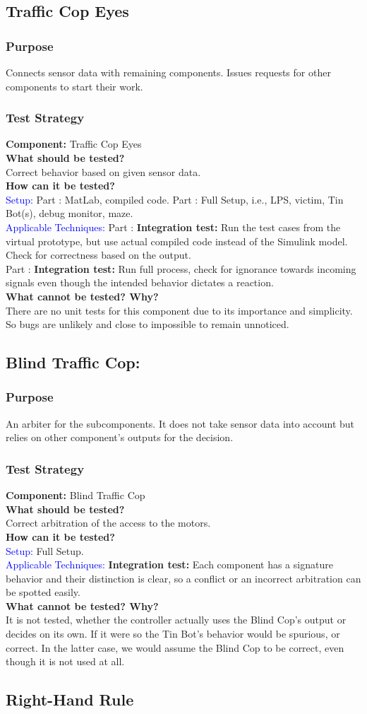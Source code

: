 \documentclass[a4paper,parskip,headheight=38pt]{scrartcl} %
\newcommand*{\rom}[1]{\uppercase\expandafter{\romannumeral #1\relax}}
\newcommand{\teststrat}[5]{
    \subsubsection{Test Strategy}
	\textbf{Component:} #1 \\
	\noindent\textbf{What should be tested?} \\
    \noindent #2 \\
	\noindent\textbf{How can it be tested?} \\
    \noindent\textcolor{blue}{Setup:} #3 \\
    \noindent\textcolor{blue}{Applicable Techniques:} #4 \\
	\noindent\textbf{What cannot be tested? Why?} \\
    \noindent #5
}
\newcommand{\ie}{i.e.}
\newcommand{\BLACK}{\textbf{Integration test: }}
\begin{document}
\subsection{Traffic Cop Eyes}
\subsubsection{Purpose}
Connects sensor data with remaining components. Issues requests for other
components to start their work.
\teststrat{Traffic Cop Eyes}{
    Correct behavior based on given sensor data.
}{
    Part \rom{1}: MatLab, compiled code. Part \rom{2}: Full Setup, \ie, LPS,
    victim, Tin Bot(s), debug monitor, maze.
}{
    Part \rom{1}: \BLACK Run the test cases from the virtual prototype, but use
    actual
    compiled code instead of the Simulink model. Check for correctness based
    on the output. \\
    Part \rom{2}: \BLACK Run full process, check for ignorance towards incoming
    signals
    even though the intended behavior dictates a reaction. 
}{
    There are no unit tests for this component due to its importance and
    simplicity. So bugs are unlikely and close to impossible to remain
    unnoticed.
}
%
\subsection{Blind Traffic Cop:}
\subsubsection{Purpose}
An arbiter for the subcomponents. It does not take sensor data into account but
relies on other component's outputs for the decision.
\teststrat{Blind Traffic Cop}{
    Correct arbitration of the access to the motors.
}{
    Full Setup.
}{
    \BLACK Each component has a signature behavior and
    their distinction is clear, so a conflict or an incorrect arbitration can be
    spotted easily.
}{
    It is not tested, whether the controller actually uses the Blind Cop's
    output or decides on its own. If it were so the Tin Bot's behavior would be
    spurious, or correct. In the latter case, we would assume the Blind Cop to
    be correct, even though it is not used at all.
}
%
\subsection{Right-Hand Rule}
\end{document}
